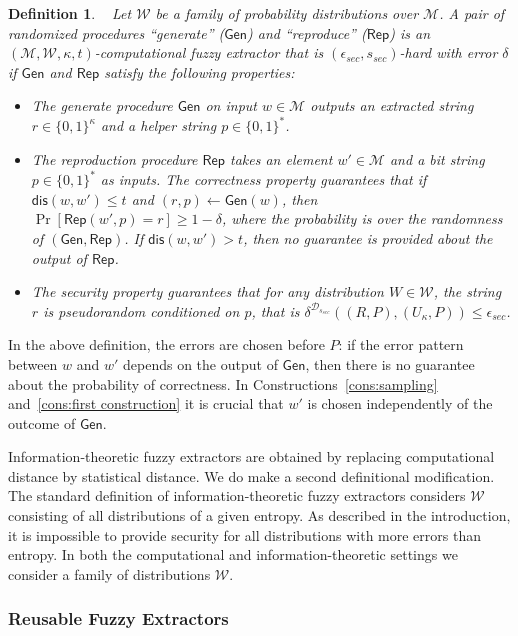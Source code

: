 \documentclass[11pt]{article}
\newcommand{\class}[1]{{\ensuremath{\mathsf{#1}}}}
\newcommand{\gen}{\ensuremath{\class{Gen}}\xspace}
\newcommand{\rep}{\ensuremath{\class{Rep}}\xspace}
\newcommand{\dis}{\ensuremath{\mathsf{dis}}}
\newtheorem{definition}[theorem]{Definition}
\begin{document}
\begin{definition}~\cite[Definition 2.5]{fuller2013computational}
\label{def:comp fuzzy extractor}
Let $\mathcal{W}$ be a family of probability distributions over $\mathcal{M}$. A pair of randomized procedures ``generate'' ($\gen$) and ``reproduce'' ($\rep$) is an $(\mathcal{M}, \mathcal{W}, \kappa, t)$-\emph{computational fuzzy extractor} that is $(\epsilon_{sec}, s_{sec})$-hard with error $\delta$ if \gen and \rep satisfy the following properties:
\begin{itemize}
\item The generate procedure \gen on input $w\in \mathcal{M}$ outputs an extracted string $r\in\{0,1\}^\kappa$ and a helper string $p\in\{0,1\}^*$.
\item The reproduction procedure \rep takes an element $w'\in\mathcal{M}$ and a bit string $p\in\{0,1\}^*$ as inputs.  The \emph{correctness} property guarantees that if $\dis(w, w')\leq t$ and $(r, p)\leftarrow \gen(w)$, then $\Pr[\rep( w', p) = r] \geq 1-\delta$, where the probability is over the randomness of $(\gen, \rep)$.
If $\dis(w, w') > t$, then no guarantee is provided about the output of \rep.
\item The \emph{security} property guarantees that for any distribution $W\in \mathcal{W}$, the string $r$ is pseudorandom conditioned on $p$, that is $\delta^{\mathcal{D}_{s_{sec}}}((R, P), (U_\kappa, P))\leq \epsilon_{sec}$.
\end{itemize}
\end{definition}
In the above definition, the errors are chosen before $P$: if the error pattern between $w$ and $w'$ depends on the output of $\gen$, then there is no guarantee about the probability of correctness. In Constructions~\ref{cons:sampling} and~\ref{cons:first construction} it is crucial that $w'$ is chosen independently of the outcome of \gen.

Information-theoretic fuzzy extractors are obtained by replacing computational distance by statistical distance.  We do make a second definitional modification.  The standard definition of information-theoretic fuzzy extractors considers $\mathcal{W}$  consisting of all distributions of a given entropy.  As described in the introduction, it is impossible to provide security for all distributions with more errors than entropy.  In both the computational and information-theoretic settings we consider a family of distributions $\mathcal{W}$.

\subsubsection{Reusable Fuzzy Extractors}
\label{sec:reusable}
\end{document}
